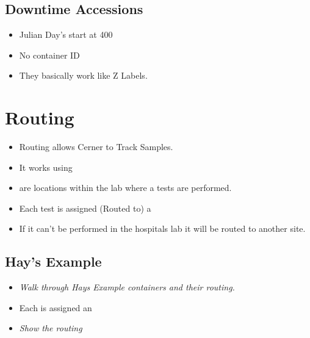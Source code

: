     \subsection{Downtime Accessions}
    \wip
        \begin{itemize}
            \item Julian Day's start at 400
            \item No container ID
            \item They basically work like Z Labels.
        \end{itemize}

\section{Routing}
        \begin{itemize}
            \item Routing allows Cerner to Track Samples.
            \item It works using 
        \end{itemize}
        \begin{itemize}
            \item {} are locations within the lab where a tests are performed.
            \item Each test is assigned (Routed to) a 
            \item If it can't be performed in the hospitals lab it will be routed to another site.
        \end{itemize}
    \subsection{Hay's Example}
        \begin{itemize}
            \item \textit{Walk through Hays Example containers and their routing.}
            \item Each  is assigned an 
            \item \textit{Show the routing}
        \end{itemize}

